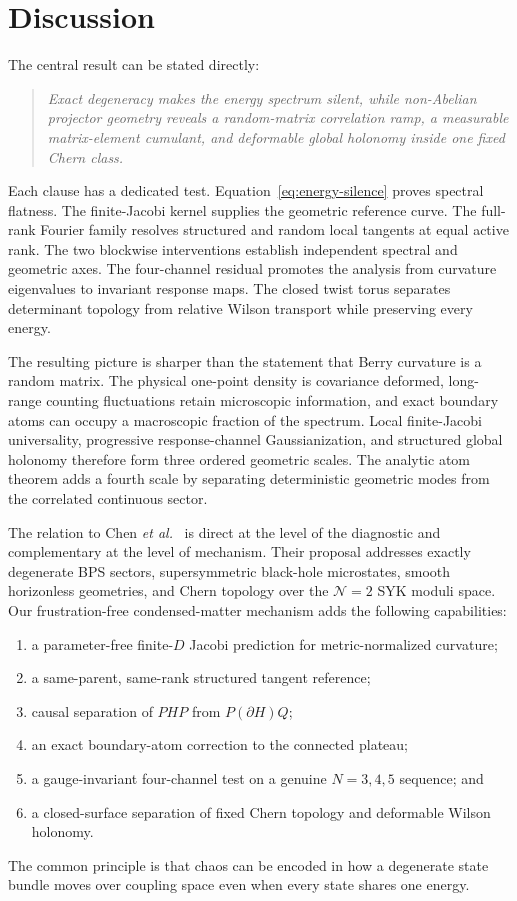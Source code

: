 \section{Discussion}
\label{sec:conclusion}

The central result can be stated directly:
\begin{quote}
\emph{Exact degeneracy makes the energy spectrum silent, while non-Abelian
projector geometry reveals a random-matrix correlation ramp, a measurable
matrix-element cumulant, and deformable global holonomy inside one fixed
Chern class.}
\end{quote}
Each clause has a dedicated test.  Equation~\eqref{eq:energy-silence} proves
spectral flatness.  The finite-Jacobi kernel supplies the geometric reference
curve.  The full-rank Fourier family resolves structured and random local
tangents at equal active rank.  The two blockwise interventions establish
independent spectral and geometric axes.  The four-channel residual promotes
the analysis from curvature eigenvalues to invariant response maps.  The
closed twist torus separates determinant topology from relative Wilson
transport while preserving every energy.

The resulting picture is sharper than the statement that Berry curvature is
a random matrix.  The physical one-point density is covariance deformed,
long-range counting fluctuations retain microscopic information, and exact
boundary atoms can occupy a macroscopic fraction of the spectrum.  Local
finite-Jacobi universality, progressive response-channel Gaussianization, and
structured global holonomy therefore form three ordered geometric scales.
The analytic atom theorem adds a fourth scale by separating deterministic
geometric modes from the correlated continuous sector.

The relation to Chen \emph{et al.}~\cite{chen2026} is direct at the level of
the diagnostic and complementary at the level of mechanism.  Their proposal
addresses exactly degenerate BPS sectors, supersymmetric black-hole
microstates, smooth horizonless geometries, and Chern topology over the
\(\mathcal N=2\) SYK moduli space.  Our frustration-free condensed-matter
mechanism adds the following capabilities:
\begin{enumerate}
 \item a parameter-free finite-\(D\) Jacobi prediction for metric-normalized
 curvature;
 \item a same-parent, same-rank structured tangent reference;
 \item causal separation of \(PHP\) from \(P(\partial H)Q\);
 \item an exact boundary-atom correction to the connected plateau;
 \item a gauge-invariant four-channel test on a genuine \(N=3,4,5\) sequence;
 and
 \item a closed-surface separation of fixed Chern topology and deformable
 Wilson holonomy.
\end{enumerate}
The common principle is that chaos can be encoded in how a degenerate state
bundle moves over coupling space even when every state shares one energy.

